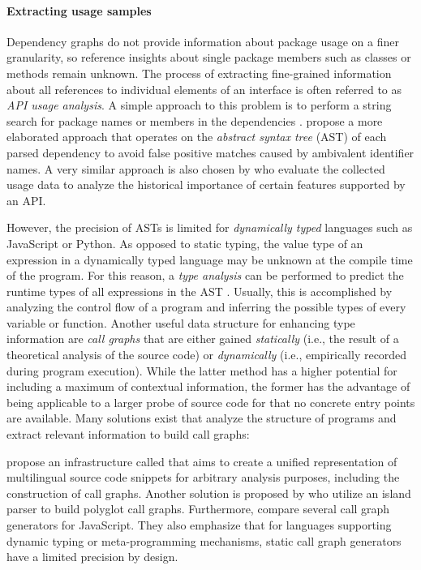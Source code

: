 \paragraph{Extracting usage samples}
\label{sec:related_work/usage_samples}

Dependency graphs do not provide information about package usage on a finer granularity, so reference insights about single package members such as classes or methods remain unknown.
The process of extracting fine-grained information about all references to individual elements of an interface is often referred to as \emph{API usage analysis}.
A simple approach to this problem is to perform a string search for package names or members in the dependencies \citep{mileva2010mining}.
\citet{qiu2016understanding} propose a more elaborated approach that operates on the \emph{abstract syntax tree} (AST) of each parsed dependency to avoid false positive matches caused by ambivalent identifier names.
A very similar approach is also chosen by \citet{sawant2017fine} who evaluate the collected usage data to analyze the historical importance of certain features supported by an API.

However, the precision of ASTs is limited for \emph{dynamically typed} languages such as JavaScript or Python.
As opposed to static typing, the value type of an expression in a dynamically typed language may be unknown at the compile time of the program.
For this reason, a \emph{type analysis} can be performed to predict the runtime types of all expressions in the AST \citep{jensen2009type}.
Usually, this is accomplished by analyzing the control flow of a program and inferring the possible types of every variable or function.
Another useful data structure for enhancing type information are \emph{call graphs} that are either gained \emph{statically} (i.e., the result of a theoretical analysis of the source code) or \emph{dynamically} (i.e., empirically recorded during program execution).
While the latter method has a higher potential for including a maximum of contextual information, the former has the advantage of being applicable to a larger probe of source code for that no concrete entry points are available.
Many solutions exist that analyze the structure of programs and extract relevant information to build call graphs:

\citet{collard2013srcml} propose an infrastructure called  that aims to create a unified representation of multilingual source code snippets for arbitrary analysis purposes, including the construction of call graphs.
Another solution is proposed by \citet{bogar2018lightweight} who utilize an island parser to build polyglot call graphs.
Furthermore, \citet{antal2018static} compare several call graph generators for JavaScript.
They also emphasize that for languages supporting dynamic typing or meta-programming mechanisms, static call graph generators have a limited precision by design.

